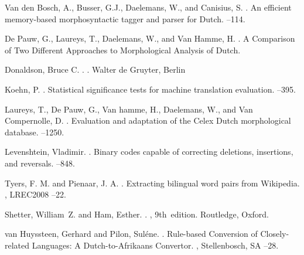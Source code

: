 \documentclass[11pt]{article}
\begin{document}
\begin{thebibliography}{}

Van den Bosch, A., Busser, G.J., Daelemans, W., and Canisius, S.
. 
\newblock An efficient memory-based morphosyntactic tagger and parser for Dutch.
--114.

De Pauw, G., Laureys, T., Daelemans, W., and Van Hamme, H.
. 
\newblock A Comparison of Two Different Approaches to Morphological Analysis of Dutch.

Donaldson, Bruce C.
.
.
\newblock Walter de Gruyter, Berlin

Koehn, P.
. 
\newblock Statistical significance tests for machine translation evaluation.
--395.

Laureys, T., De Pauw, G., Van hamme, H., Daelemans, W., and Van Compernolle, D.
. 
\newblock Evaluation and adaptation of the Celex Dutch morphological database.
--1250.

Levenshtein, Vladimir.
. 
\newblock Binary codes capable of correcting deletions, insertions, and reversals.
--848.

Tyers, F. M. and Pienaar, J. A.
. 
\newblock Extracting bilingual word pairs from Wikipedia.
, LREC2008
--22. 

Shetter, William~Z. and Ham, Esther.
.
, 9th~edition.
\newblock Routledge, Oxford.

van Huyssteen, Gerhard and Pilon, Suléne.
. 
\newblock Rule-based Conversion of Closely-related Languages: A Dutch-to-Afrikaans Convertor. 
, Stellenbosch, SA
--28.



\end{thebibliography}
\end{document}
